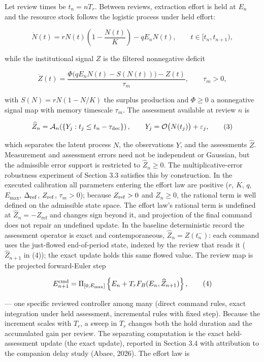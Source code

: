 \documentclass[11pt]{article}
\begin{document}
Let review times be \(t_n=nT_r\). Between reviews, extraction effort is
held at \(E_n\) and the resource stock follows the logistic process
under held effort:

\[
\dot N(t)=rN(t)\left(1-\frac{N(t)}{K}\right)-qE_nN(t),\qquad t\in[t_n,t_{n+1}),
\tag{1}
\]

while the institutional signal \(Z\) is the filtered nonnegative deficit

\[
\dot Z(t)=\frac{\Phi\bigl(qE_nN(t)-S(N(t))\bigr)-Z(t)}{\tau_m},\qquad \tau_m>0,
\tag{2}
\]

with \(S(N)=rN(1-N/K)\) the surplus production and \(\Phi\ge 0\) a
nonnegative signal map with memory timescale \(\tau_m\). The assessment
available at review \(n\) is

\[
\widehat Z_n=\mathcal A_n\!\left(\{Y_j:t_j\le t_n-\tau_{\rm dec}\}\right),\qquad
Y_j=\mathcal O\bigl(N(t_j)\bigr)+\varepsilon_j,
\tag{3}
\]

which separates the latent process \(N\), the observations \(Y\), and
the assessments \(\widehat Z\). Measurement and assessment errors need
not be independent or Gaussian, but the admissible error support is
restricted to \(\widehat Z_n \ge 0\). The multiplicative-error
robustness experiment of Section 3.3 satisfies this by construction. In the executed calibration all parameters entering the effort law are positive (\(r\), \(K\), \(q\), \(E_{\max}\), \(\Delta_{\rm ref}\), \(Z_{\rm ref}\), \(\tau_m > 0\)); because \(Z_{\rm ref} > 0\) and \(\widehat Z_n \ge 0\), the rational term is well defined on the admissible state space. The effort law's rational term is undefined at
\(\widehat Z_n = -Z_{\mathrm{ref}}\) and changes sign beyond it, and
projection of the final command does not repair an undefined update. In
the baseline deterministic record the assessment operator is exact and
contemporaneous, \(\widehat Z_n = Z(t_n^-)\): each command uses the just-flowed end-of-period state, indexed by the review that reads it (\(\widehat Z_{n+1}\) in (4)); the exact update holds this same flowed value. The review map is the
projected forward-Euler step

\[
E^{\rm cmd}_{n+1}=\Pi_{[0,E_{\max}]}\left\{E_n+T_rF_B(E_n,\widehat Z_{n+1})\right\},
\tag{4}
\]

--- one specific reviewed controller among many (direct command rules,
exact integration under held assessment, incremental rules with fixed
step). Because the increment scales with \(T_r\), a sweep in \(T_r\)
changes both the hold duration and the accumulated gain per review. The
separating computation is the exact held-assessment update (the exact update), reported in
Section 3.4 with attribution to the companion delay study (Abaee, 2026). The effort law is
\end{document}
